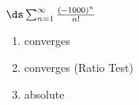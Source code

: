 {$\ds \sum_{n=1}^\infty \frac{(-1000)^n}{n!}$
}
{\begin{enumerate}
	\item converges
	\item	converges (Ratio Test)
	\item absolute
\end{enumerate}
}